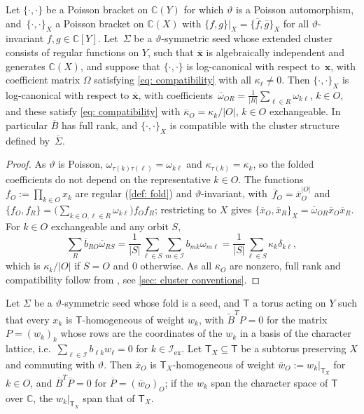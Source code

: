 \documentclass[a4paper]{amsart}
\numberwithin{equation}{section}
\theoremstyle{definition}
\theoremstyle{remark}
\newcommand{\bbC}{\mathbb{C}}
\newcommand{\mcI}{\mathcal{I}}
\newcommand{\bx}{\mathbf{x}}
\newcommand{\tB}{\widetilde{B}}
\newcommand{\vt}{\vartheta}
\newcommand{\ex}{\mathrm{ex}}
\begin{document}
\begin{proposition}
  \label{prop: fold compatible}
  Let $\{\cdot,\cdot\}$ be a Poisson bracket on $\bbC(Y)$ for which $\vt$ is a Poisson automorphism, and~$\{\cdot,\cdot\}_X$ a Poisson bracket on $\bbC(X)$ with $\{f,g\}|_X=\{\overline{f},\overline{g}\}_X$ for all $\vt$-invariant $f,g\in\bbC[Y]$.
  Let~$\Sigma$ be a $\vt$-symmetric seed whose extended cluster consists of regular functions on $Y$, such that $\overline{\bx}$ is algebraically independent and generates $\bbC(X)$, and suppose that $\{\cdot,\cdot\}$ is log-canonical with respect to~$\bx$, with coefficient matrix $\Omega$ satisfying \eqref{eq: compatibility} with all $\kappa_\ell\neq0$.
  Then $\{\cdot,\cdot\}_X$ is log-canonical with respect to $\overline{\bx}$, with coefficients~$\overline{\omega}_{OR}=\frac1{|R|}\sum_{\ell\in R}\omega_{k\ell}$, $k\in O$, and these satisfy \eqref{eq: compatibility} with $\overline{\kappa}_O=\kappa_k/|O|$, $k\in O$ exchangeable.
  In particular $\overline{B}$ has full rank, and $\{\cdot,\cdot\}_X$ is compatible with the cluster structure defined by~$\overline{\Sigma}$.
\end{proposition}
\begin{proof}

  As $\vt$ is Poisson, $\omega_{\tau(k)\tau(\ell)}=\omega_{k\ell}$ and $\kappa_{\tau(k)}=\kappa_k$, so the folded coefficients do not depend on the representative $k\in O$.
  The functions $f_O:=\prod_{k\in O}x_k$ are regular (\cref{def: fold}) and $\vt$-invariant, with~$\overline{f}_O=\overline{x}_O^{|O|}$ and $\{f_O,f_R\}=\big(\sum_{k\in O,\ell\in R}\omega_{k\ell}\big)f_Of_R$; restricting to $X$ gives $\{\overline{x}_O,\overline{x}_R\}_X=\overline{\omega}_{OR}\overline{x}_O\overline{x}_R$.
  For $k\in O$ exchangeable and any orbit $S$,
  \[
    \sum_R\overline{b}_{RO}\overline{\omega}_{RS}=\frac1{|S|}\sum_{\ell\in S}\sum_{m\in\mcI}b_{mk}\omega_{m\ell}=\frac1{|S|}\sum_{\ell\in S}\kappa_k\delta_{k\ell},
  \]
  which is $\kappa_k/|O|$ if $S=O$ and $0$ otherwise.
  As all $\overline{\kappa}_O$ are nonzero, full rank and compatibility follow from \cite[Proposition~2.5]{GSV18dd}, see \cref{sec: cluster conventions}.
\end{proof}

\begin{proposition}
  \label{prop: fold toric}
  Let $\Sigma$ be a $\vt$-symmetric seed whose fold is a seed, and $\mathsf T$ a torus acting on $Y$ such that every $x_k$ is $\mathsf T$-homogeneous of weight $w_k$, with $\tB^TP=0$ for the matrix $P=(w_k)_k$ whose rows are the coordinates of the $w_k$ in a basis of the character lattice, i.e.\ $\sum_{\ell\in\mcI}b_{\ell k}w_\ell=0$ for $k\in\mcI_\ex$.
  Let $\mathsf T_X\subseteq\mathsf T$ be a subtorus preserving $X$ and commuting with $\vt$.
  Then $\overline{x}_O$ is $\mathsf T_X$-homogeneous of weight $\overline{w}_O:=w_k|_{\mathsf T_X}$ for $k\in O$, and $\overline{B}^T\overline{P}=0$ for $\overline{P}=(\overline{w}_O)_O$; if the $w_k$ span the character space of $\mathsf T$ over $\bbC$, the $w_k|_{\mathsf T_X}$ span that of $\mathsf T_X$.
\end{proposition}
\end{document}
